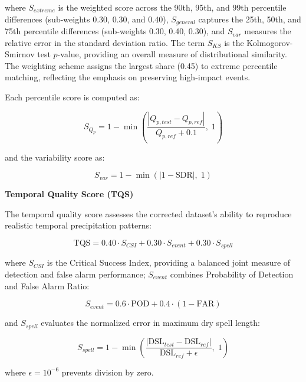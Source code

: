 \documentclass[11pt,a4paper]{article}
\begin{document}
where \(S_{extreme}\) is the weighted score across the 90th, 95th, and
99th percentile differences (sub-weights 0.30, 0.30, and 0.40),
\(S_{general}\) captures the 25th, 50th, and 75th percentile differences
(sub-weights 0.30, 0.40, 0.30), and \(S_{var}\) measures the relative
error in the standard deviation ratio. The term \(S_{KS}\) is the
Kolmogorov-Smirnov test \(p\)-value, providing an overall measure of
distributional similarity. The weighting scheme assigns the largest
share (0.45) to extreme percentile matching, reflecting the emphasis on
preserving high-impact events.

Each percentile score is computed as:

\begin{equation}S_{Q_p} = 1 - \min\left(\frac{|Q_{p,test} - Q_{p,ref}|}{Q_{p,ref} + 0.1}, \; 1\right)\end{equation}

and the variability score as:

\begin{equation}S_{var} = 1 - \min(|1 - \text{SDR}|, \; 1)\end{equation}

\textbf{Temporal Quality Score (TQS)}

The temporal quality score assesses the corrected dataset's ability to
reproduce realistic temporal precipitation patterns:

\begin{equation}\text{TQS} = 0.40 \cdot S_{CSI} + 0.30 \cdot S_{event} + 0.30 \cdot S_{spell}\end{equation}

where \(S_{CSI}\) is the Critical Success Index, providing a balanced
joint measure of detection and false alarm performance; \(S_{event}\)
combines Probability of Detection and False Alarm Ratio:

\begin{equation}S_{event} = 0.6 \cdot \text{POD} + 0.4 \cdot (1 - \text{FAR})\end{equation}

and \(S_{spell}\) evaluates the normalized error in maximum dry spell
length:

\begin{equation}S_{spell} = 1 - \min\left(\frac{|\text{DSL}_{test} - \text{DSL}_{ref}|}{\text{DSL}_{ref} + \epsilon}, \; 1\right)\end{equation}

where \(\epsilon = 10^{-6}\) prevents division by zero.
\end{document}

